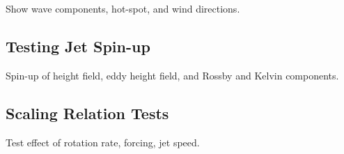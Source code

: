 Show wave components, hot-spot, and wind directions.

\subsection*{Testing Jet Spin-up}

Spin-up of height field, eddy height field, and Rossby and Kelvin components.

\subsection*{Scaling Relation Tests}

Test effect of rotation rate, forcing, jet speed.










% 
% 
